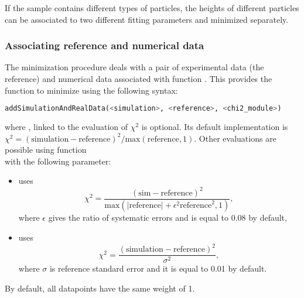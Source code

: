 \noindent If the sample contains different types of particles, the heights of different particles can be associated to two different
fitting parameters and minimized separately.\\



\subsubsection{Associating reference and numerical data}
The minimization procedure deals with a pair of experimental data (the
reference) and numerical data associated with function
. This provides the function to minimize
using the following syntax:

\begin{lstlisting}[language=python, style=eclipse,numbers=none]
addSimulationAndRealData(<simulation>, <reference>, <chi2_module>)
\end{lstlisting}
where , linked to the evaluation of $\chi^2$ is
optional. Its default implementation is
 $\chi^2 =(\text{simulation}-\text{reference})^2/\text{max}(\text{reference},1).$ Other
 evaluations are possible using function \\  with the following parameter:
\begin{itemize}
\item {}  uses
   $$\chi^2=
   \frac{(\text{sim}-\text{reference})^2}{\text{max}(|\text{reference}| +
   \epsilon^2 \text{reference}^2,1)},$$ 
where $\epsilon$ gives the ratio
   of systematic errors and is
   equal to 0.08 by default,
\item {} uses
    $$\chi^2 =\frac{(\text{simulation}-\text{reference})^2}{\sigma^2},$$ where
    $\sigma$ is reference standard error and it is equal to 0.01 by default.
\end{itemize}
\noindent By default, all datapoints have the same weight of 1. \\



